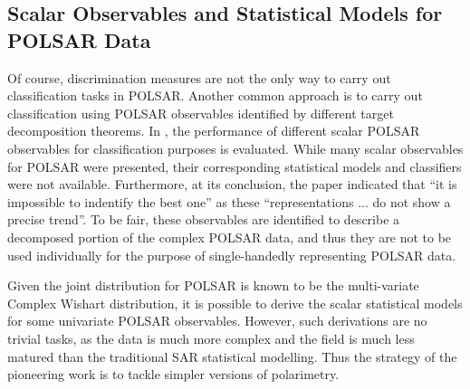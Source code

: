 \documentclass[journal]{IEEEtran}
\begin{document}
\subsection{Scalar Observables and Statistical Models for POLSAR Data}

Of course, discrimination measures are not the only way to carry out classification tasks in POLSAR.
Another common approach is to carry out classification using POLSAR observables identified by different target decomposition theorems.
In \cite{Alberga_2008_IJRS_4129}, the performance of different scalar POLSAR observables for classification purposes is evaluated.
While many scalar observables for POLSAR were presented, their corresponding statistical models and classifiers were not available.
Furthermore, at its conclusion, the paper indicated that ``it is impossible to indentify the best one''
  as these ``representations ... do not show a precise trend''.
To be fair, these observables are identified to describe a decomposed portion of the complex POLSAR data,
  and thus they are not to be used individually for the purpose of single-handedly representing POLSAR data.

Given the joint distribution for POLSAR is known to be the multi-variate Complex Wishart distribution,
  it is possible to derive the scalar statistical models for some univariate POLSAR observables.
However, such derivations are no trivial tasks,
  as the data is much more complex and the field is much less matured than the traditional SAR statistical modelling.
Thus the strategy of the pioneering work is to tackle simpler versions of polarimetry.
\end{document}
